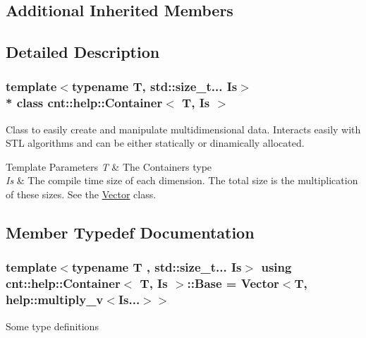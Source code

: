 \subsection*{Additional Inherited Members}


\subsection{Detailed Description}
\subsubsection*{template$<$typename T, std\+::size\+\_\+t... Is$>$\\*
class cnt\+::help\+::\+Container$<$ T, Is $>$}

Class to easily create and manipulate multidimensional data. Interacts easily with S\+TL algorithms and can be either statically or dinamically allocated.


\begin{DoxyTemplParams}{Template Parameters}
{\em T} & The Containers type \\
\hline
{\em Is} & The compile time size of each dimension. The total size is the multiplication of these sizes. See the \textquotesingle{}\hyperlink{structcnt_1_1Vector}{Vector}\textquotesingle{} class. \\
\hline
\end{DoxyTemplParams}


\subsection{Member Typedef Documentation}
\subsubsection[{\texorpdfstring{Base}{Base}}]{\setlength{\rightskip}{0pt plus 5cm}template$<$typename T , std\+::size\+\_\+t... Is$>$ using {\bf cnt\+::help\+::\+Container}$<$ T, Is $>$\+::{\bf Base} =  {\bf Vector}$<$T, {\bf help\+::multiply\+\_\+v}$<$Is...$>$$>$}\hypertarget{classcnt_1_1help_1_1Container_a0996cbe40d133dbec82facc6a17cf1f8}{}\label{classcnt_1_1help_1_1Container_a0996cbe40d133dbec82facc6a17cf1f8}
Some type definitions 
